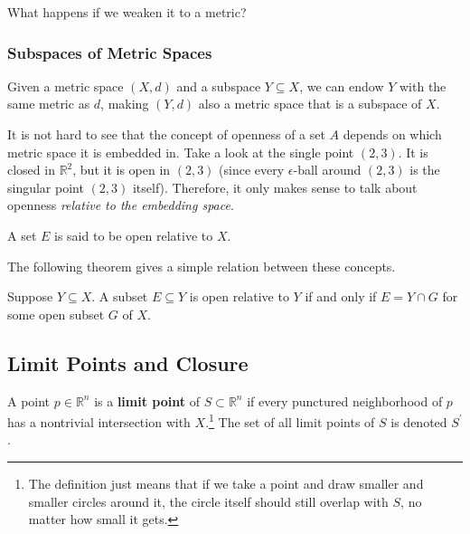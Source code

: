 \documentclass{article}
\begin{document}
      What happens if we weaken it to a metric? 

    \subsubsection{Subspaces of Metric Spaces}

      \begin{definition}
        Given a metric space $(X, d)$ and a subspace $Y \subseteq X$, we can endow $Y$ with the same metric as $d$, making $(Y, d)$ also a metric space that is a subspace of $X$. 
      \end{definition}

      It is not hard to see that the concept of openness of a set $A$ depends on which metric space it is embedded in. Take a look at the single point $(2, 3)$. It is closed in $\mathbb{R}^2$, but it is open in $(2, 3)$ (since every $\epsilon$-ball around $(2, 3)$ is the singular point $(2, 3)$ itself). Therefore, it only makes sense to talk about openness \textit{relative to the embedding space}. 

      \begin{definition}
        A set $E$ is said to be open relative to $X$. 
      \end{definition}

      The following theorem gives a simple relation between these concepts. 

      \begin{theorem}
        Suppose $Y \subseteq X$. A subset $E \subseteq Y$ is open relative to $Y$ if and only if $E = Y \cap G$ for some open subset $G$ of $X$. 
      \end{theorem}

  \subsection{Limit Points and Closure} 

    \begin{definition}
      A point $p \in \mathbb{R}^n$ is a \textbf{limit point} of $S \subset \mathbb{R}^n$ if every punctured neighborhood of $p$ has a nontrivial intersection with $X$.\footnote{The definition just means that if we take a point and draw smaller and smaller circles around it, the circle itself should still overlap with $S$, no matter how small it gets. } The set of all limit points of $S$ is denoted $S^\prime$. 
    \end{definition}
\end{document}
